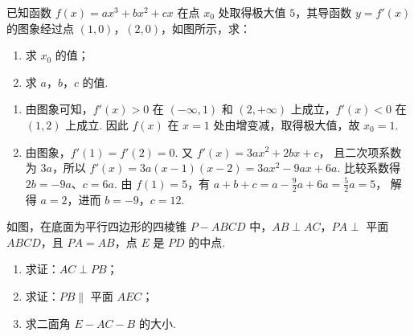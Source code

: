 \begin{problem}
已知函数 \(f(x)=ax^3+bx^2+cx\) 在点 \(x_0\) 处取得极大值 \(5\)，其导函数 \(y=f'(x)\) 的图象经过点 \((1,0)\)，\((2,0)\)，如图所示，求：

\begin{enumerate}
\item 求 \(x_0\) 的值；
\item 求 \(a\)，\(b\)，\(c\) 的值.
\end{enumerate}

\end{problem}

\begin{solution}
\begin{enumerate}
\item 由图象可知，\(f'(x)>0\) 在 \((-\infty,1)\) 和 \((2,+\infty)\) 上成立，\(f'(x)<0\) 在 \((1,2)\) 上成立. 因此 \(f(x)\) 在 \(x=1\) 处由增变减，取得极大值，故 \(x_0=1\).
\item 由图象，\(f'(1)=f'(2)=0\). 又 \(f'(x)=3ax^2+2bx+c\)，
且二次项系数为 \(3a\)，所以
\(f'(x)=3a(x-1)(x-2)=3ax^2-9ax+6a\). 比较系数得 \(2b=-9a\)、\(c=6a\). 由 \(f(1)=5\)，有 \(a+b+c=a-\frac92a+6a=\frac52a=5\)，
解得 \(a=2\)，进而 \(b=-9\)，\(c=12\).
\end{enumerate}
\end{solution}

\begin{problem}
如图，在底面为平行四边形的四棱锥 \(P-ABCD\) 中，\(AB\perp AC\)，\(PA\perp\) 平面 \(ABCD\)，且 \(PA=AB\)，点 \(E\) 是 \(PD\) 的中点.

\begin{enumerate}
\item 求证：\(AC\perp PB\)；
\item 求证：\(PB\parallel\) 平面 \(AEC\)；
\item 求二面角 \(E-AC-B\) 的大小.
\end{enumerate}

\end{problem}

